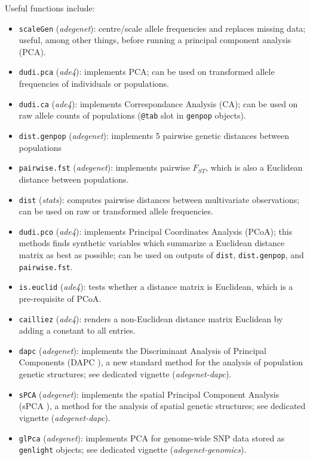 \documentclass{article}
\begin{document}
Useful functions include:
\begin{itemize}
  \item \texttt{scaleGen} (\textit{adegenet}): centre/scale allele frequencies and replaces missing
    data; useful, among other things, before running a principal component analysis (PCA).
  \item \texttt{dudi.pca} (\textit{ade4}): implements PCA; can be used on transformed allele
    frequencies of individuals or populations.
  \item \texttt{dudi.ca} (\textit{ade4}): implements Correspondance Analysis (CA); can be used on raw
    allele counts of populations (\texttt{@tab} slot in \texttt{genpop} objects).
  \item \texttt{dist.genpop} (\textit{adegenet}): implements 5 pairwise genetic distances between populations
  \item \texttt{pairwise.fst} (\textit{adegenet}): implements pairwise $F_{ST}$, which is also a
    Euclidean distance between populations.
  \item \texttt{dist} (\textit{stats}): computes pairwise distances between multivariate
    observations; can be used on raw or transformed allele frequencies.
  \item \texttt{dudi.pco} (\textit{ade4}): implements Principal Coordinates Analysis (PCoA); this
    methods finds synthetic variables which summarize a Euclidean distance matrix as best as
    possible; can be used on outputs of \texttt{dist}, \texttt{dist.genpop}, and \texttt{pairwise.fst}.
  \item \texttt{is.euclid} (\textit{ade4}): tests whether a distance matrix is Euclidean, which is a
    pre-requisite of PCoA.
  \item \texttt{cailliez} (\textit{ade4}): renders a non-Euclidean distance matrix Euclidean by
    adding a constant to all entries.
  \item \texttt{dapc} (\textit{adegenet}): implements the Discriminant Analysis of Principal
    Components (DAPC \cite{tjart19}), a new standard method for the analysis of population genetic structures; see
    dedicated vignette (\textit{adegenet-dapc}).
  \item \texttt{sPCA} (\textit{adegenet}): implements the spatial Principal Component Analysis
    (sPCA \cite{tjart04}), a method for the analysis of spatial genetic structures; see dedicated vignette (\textit{adegenet-dapc}).
  \item \texttt{glPca} (\textit{adegenet}): implements PCA for genome-wide SNP data stored as
    \texttt{genlight} objects; see dedicated vignette (\textit{adegenet-genomics}).
\end{itemize}
\end{document}
